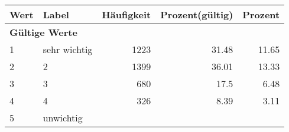      \begin{longtable}{lXrrr}
     \toprule
     \textbf{Wert} & \textbf{Label} & \textbf{Häufigkeit} & \textbf{Prozent(gültig)} & \textbf{Prozent} \\
     \endhead
     \midrule
     \multicolumn{5}{l}{\textbf{Gültige Werte}}\\

     1 &
     \multicolumn{1}{X}{ sehr wichtig   } &


       \num{1223} &
       \num[round-mode=places,round-precision=2]{31,48} &
         \num[round-mode=places,round-precision=2]{11,65} \\

     2 &
     \multicolumn{1}{X}{ 2   } &


       \num{1399} &
       \num[round-mode=places,round-precision=2]{36,01} &
         \num[round-mode=places,round-precision=2]{13,33} \\

     3 &
     \multicolumn{1}{X}{ 3   } &


       \num{680} &
       \num[round-mode=places,round-precision=2]{17,5} &
         \num[round-mode=places,round-precision=2]{6,48} \\

     4 &
     \multicolumn{1}{X}{ 4   } &


       \num{326} &
       \num[round-mode=places,round-precision=2]{8,39} &
         \num[round-mode=places,round-precision=2]{3,11} \\

     5 &
     \multicolumn{1}{X}{ unwichtig   } &



\end{longtable}

